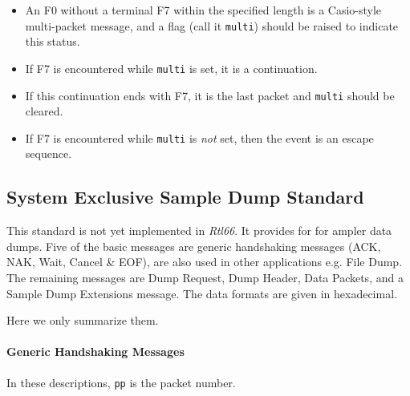    \begin{itemize}
      \item An F0 without a terminal F7 within the specified length
         is a Casio-style multi-packet message,
         and a flag (call it \texttt{multi})
         should be raised to indicate this status.
      \item If F7 is encountered while \texttt{multi} is set,
         it is a continuation.
      \item If this continuation ends with F7, it is the last packet and
         \texttt{multi} should be cleared.
      \item If F7 is encountered while \texttt{multi} is \textsl{not} set,
         then the event is an escape sequence.
   \end{itemize}

\subsection{System Exclusive Sample Dump Standard}
\label{subsec:midi_meta_sysex_sample_dump_standard}

   This standard is not yet implemented in \textsl{Rtl66}.
   It provides for for ampler data dumps.
   Five of the basic messages are generic handshaking messages (ACK, NAK, Wait,
   Cancel \& EOF), are also used in other applications e.g. File Dump.
   The remaining messages are Dump Request, Dump Header, Data Packets, and a
   Sample Dump Extensions message.  The data formats are given in hexadecimal.

   Here we only summarize them.

\paragraph{Generic Handshaking Messages}
\label{paragraph:midi_seq66_generic_handshaking}

   In these descriptions, \texttt{pp} is the packet number.

